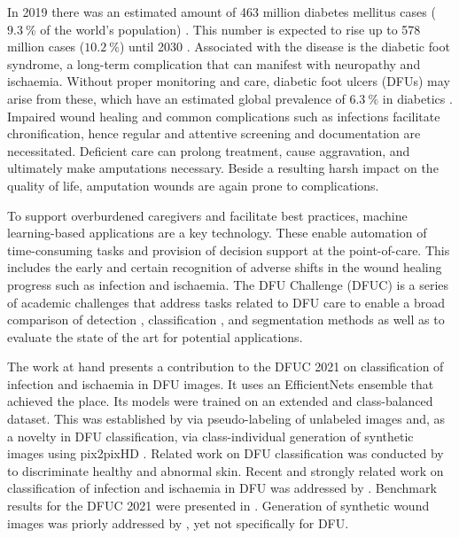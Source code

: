 \documentclass[runningheads]{llncs}
\begin{document}
In 2019 there was an estimated amount of 463 million diabetes mellitus cases ($9.3~\%$ of the world's population) \cite{Saeedi_2019}. This number is expected to rise up to 578 million cases ($10.2~\%$) until 2030 \cite{Saeedi_2019}. Associated with the disease is the diabetic foot syndrome, a long-term complication that can manifest with neuropathy and ischaemia. Without proper monitoring and care, diabetic foot ulcers (DFUs) may arise from these, which have an estimated global prevalence of $6.3~\%$ in diabetics \cite{zhang2016dfu_prevalence}. Impaired wound healing \cite{falanga2005diabeticwoundhealing} and common complications such as infections \cite{siddiqui2010chronic_wound_infection} facilitate chronification, hence regular and attentive screening and documentation are necessitated. Deficient care can prolong treatment, cause aggravation, and ultimately make amputations necessary. Beside a resulting harsh impact on the quality of life, amputation wounds are again prone to complications.

To support overburdened caregivers and facilitate best practices, machine learning-based applications are a key technology. These enable automation of time-consuming tasks and provision of decision support at the point-of-care. This includes the early and certain recognition of adverse shifts in the wound healing progress such as infection and ischaemia. The DFU Challenge (DFUC) is a series of academic challenges that address tasks related to DFU care to enable a broad comparison of detection \cite{dfuc2020}, classification \cite{dfuc2021}, and segmentation \cite{dfuc2022} methods as well as to evaluate the state of the art \cite{yap2021detection} for potential applications.

The work at hand presents a contribution to the DFUC 2021 \cite{dfuc2021} on classification of infection and ischaemia in DFU images. It uses an EfficientNets \cite{EfficientNet} ensemble that achieved the  place. Its models were trained on an extended and class-balanced dataset. This was established by via pseudo-labeling of unlabeled images and, as a novelty in DFU classification, via class-individual generation of synthetic images using pix2pixHD \cite{wang2018}.
Related work on DFU classification was conducted by \cite{alzubaidi2019dfu_qutnet,das2021dfu_spnet,goyal2020dfunet} to discriminate healthy and abnormal skin. Recent and strongly related work on classification of infection and ischaemia in DFU was addressed by \cite{das2021recognition,goyal2020dfunet}. Benchmark results for the DFUC 2021 were presented in \cite{10.1109/BHI50953.2021.9508563}. Generation of synthetic wound images was priorly addressed by \cite{sarp2021woundgan,zhang2018woundgan}, yet not specifically for DFU.
\end{document}
